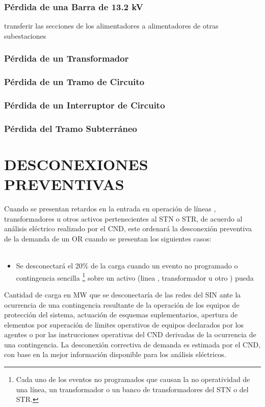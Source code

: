 \documentclass[a5paper]{book}%
\begin{document}
\subsubsection{Pérdida de una Barra de 13.2 kV}

 transferir las secciones de los alimentadores a alimentadores de otras
subestaciones

\subsubsection{Pérdida de un Transformador}

\subsubsection{Pérdida de un Tramo de Circuito}

\subsubsection{Pérdida de un Interruptor de Circuito}

\subsubsection{Pérdida del Tramo Subterráneo}

\section{DESCONEXIONES PREVENTIVAS}

Cuando se presentan retardos en la entrada  en operación de líneas , transformadores u otros activos pertenecientes al \ac{STN} o \ac{STR},  de acuerdo al análisis eléctrico  realizado por el \ac{CND},  este ordenará la desconexión preventiva de la demanda de un \ac{OR} cuando se presentan los siguientes casos: \cite{CREG2242016} \\\\

\begin{itemize}
\item Se desconectará el 20\% de la carga cuando un evento no programado o contingencia sencilla  \footnote[1]{Cada uno de los eventos no programados que causan la no operatividad de una línea, un transformador o un banco de transformadores del STN o del STR.}  sobre un activo (linea , transformador u otro ) pueda 
  \end{itemize}

Cantidad de carga en MW que se desconectaría de las redes del SIN ante la ocurrencia de una contingencia resultante de la operación de los equipos de protección del sistema, actuación de esquemas suplementarios, apertura de elementos por superación de límites operativos de equipos declarados por los agentes o por las instrucciones operativas del CND derivadas de la ocurrencia de una contingencia. La desconexión correctiva de demanda es estimada por el CND, con base en la mejor información disponible para los análisis eléctricos.
\end{document}
